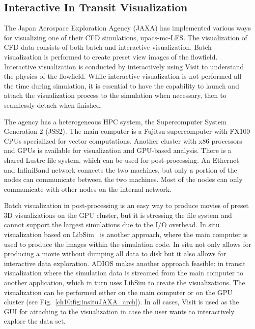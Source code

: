 \documentclass[x11names,table,xcdraw,graybox]{svmult}
\begin{document}






\subsection{Interactive In Transit Visualization}
\label{sec:jaxa}
The Japan Aerospace Exploration Agency (JAXA) has implemented various ways for visualizing one of their CFD simulations, upacs-mc-LES. The visualization of CFD data consists of both batch and interactive visualization. Batch visualization is performed to create preset view images of the flowfield. Interactive visualization is conducted by interactively using Visit to understand the physics of the flowfield. While interactive visualization is not performed all the time during simulation, it is essential to have the capability to launch and attach the visualization process to the simulation when necessary, then to seamlessly detach when finished.

The agency has a heterogeneous HPC system, the Supercomputer System Generation 2 (JSS2). The main computer is a Fujitsu supercomputer with FX100 CPUs specialized for vector computations. Another cluster with x86 processors and GPUs is available for visualization and GPU-based analysis. There is a shared Lustre file system, which can be used for post-processing. An Ethernet and InfiniBand network connects the two machines, but only a portion of the nodes can communicate between the two machines. Most of the nodes can only communicate with other nodes on the internal network.

Batch visualization in post-processing is an easy way to produce movies of preset 3D visualizations on the GPU cluster, but it is stressing the file system and cannot support the largest simulations due to the I/O overhead. In situ visualization based on LibSim~\cite{libsim} is another approach, where the main computer is used to produce the images within the simulation code. In situ not only allows for producing a movie without dumping all data to disk but it also allows for interactive data exploration. ADIOS makes another approach feasible: in transit visualization where the simulation data is streamed from the main computer to another application, which in turn uses LibSim to create the visualizations. The visualization can be performed either on the main computer or on the GPU cluster (see Fig.~\ref{ch10:fig:insituJAXA_arch}). In all cases, Visit is used as the GUI for attaching to the visualization in case the user wants to interactively explore the data set.
\end{document}
